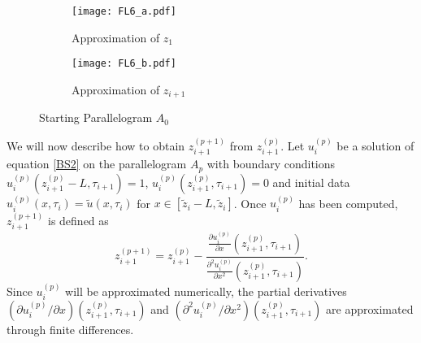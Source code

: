 \documentclass[00main.tex]{subfiles}
\begin{document}
\begin{figure}
\centering 
\begin{subfigure}{.46\textwidth} \centering
\texttt{[image: FL6\_a.pdf]}
\caption{Approximation of $z_1$}
\label{Fig2a}
\end{subfigure}
\begin{subfigure}{.45\textwidth} \centering
\texttt{[image: FL6\_b.pdf]}
\caption{Approximation of $z_{i+1}$}
\label{Fig2b}
\end{subfigure}
\caption{Starting Parallelogram $A_0$}
\label{Fig2}
\end{figure}  


We will now describe how to obtain $z_{i+1}^{(p+1)}$ from $z_{i+1}^{(p)}$. Let $u_i^{(p)}$ be a solution of equation \eqref{BS2} on the parallelogram $A_p$ with boundary conditions 
$u_i^{(p)}(z_{i+1}^{(p)} - L,\tau_{i+1})= 1$,  $u_i^{(p)}(z_{i+1}^{(p)},\tau_{i+1}) = 0$ and initial data $u_i^{(p)}(x,\tau_i) =  \tilde{u}(x,\tau_i)$
for $x\in [\tilde{z}_i-L,\tilde{z}_i]$.
%
%
Once $u_i^{(p)}$ has been computed,  $z_{i+1}^{(p+1)}$ is defined as
\begin{equation}
z_{i+1}^{(p+1)} = z_{i+1}^{(p)} -  \frac{\frac{\partial {u_i^{(p)}}}{\partial x}(z_{i+1}^{(p)},\tau_{i+1})}{\frac{\partial^2 {u_i^{(p)}}}{\partial x^2} (z_{i+1}^{(p)},\tau_{i+1})} .
\label{ApX1}
\end{equation} Since $u_i^{(p)}$ will be approximated numerically,  the partial derivatives $(\partial {u_i^{(p)}}/\partial x) (z_{i+1}^{(p)},\tau_{i+1})$ and $(\partial^2 {u_i^{(p)}}/\partial x^2) (z_{i+1}^{(p)},\tau_{i+1})$ are approximated through finite differences.
\end{document}

